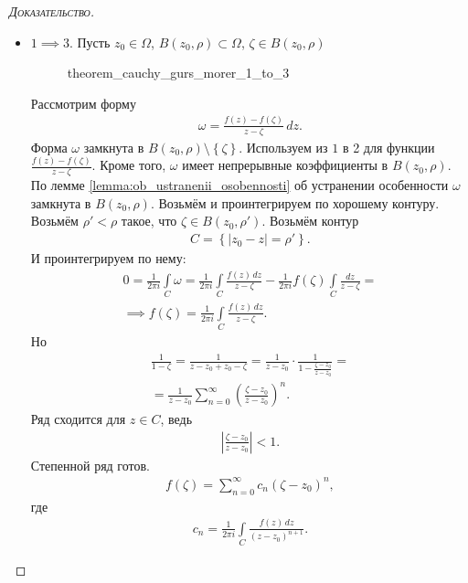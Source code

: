 \begin{proof}[\normalfont\textsc{Доказательство}]
\begin{itemize}
\item $1 \implies 3$. Пусть $z_0 \in \Omega$, $B(z_0, \rho) \subset \Omega$, $\zeta \in B(z_0, \rho)$
\begin{figure}[ht]
    \centering
    \caption{theorem_cauchy_gurs_morer_1_to_3}
    \label{fig:theorem_cauchy_gurs_morer_1_to_3}
\end{figure}

 Рассмотрим форму
 \begin{align*}
  \omega = \frac{f(z) - f(\zeta)}{z-\zeta}\,dz.
 \end{align*} Форма $\omega$ замкнута в $B(z_0, \rho) \setminus \left\{ \zeta \right\}$. Используем из $1$ в 2 для функции $\frac{f(z) - f(\zeta)}{z-\zeta}$. Кроме того, $\omega$ имеет непрерывные коэффициенты в $B(z_0, \rho)$. По лемме \ref{lemma:ob_ustranenii_osobennosti} об устранении особенности $\omega$ замкнута в $B(z_0, \rho)$. Возьмём и проинтегрируем по хорошему контуру. Возьмём $\rho' < \rho$ такое, что $\zeta \in B(z_0, \rho')$. Возьмём контур
 \begin{align*}
  C = \left\{ \left| z_0 - z \right| = \rho' \right\}.
 \end{align*} И проинтегрируем по нему:
 \begin{align*}
  0=\frac{1}{2\pi i} \int\limits_{C} \omega  = \frac{1}{2\pi i} \int\limits_{C} \frac{f(z)\,dz}{z - \zeta}  - \frac{1}{2\pi i} f(\zeta) \int\limits_{C} \frac{dz}{z - \zeta} = \\
  \implies f(\zeta) = \frac{1}{2\pi i} \int\limits_{C} \frac{f(z)\,dz}{z - \zeta}.
 \end{align*} Но
 \begin{align*}
  \frac{1}{1 - \zeta} = \frac{1}{z - z_0 + z_0 - \zeta} = \frac{1}{z - z_0} \cdot \frac{1}{1 -  \frac{\zeta - z_0}{z - z_0}} = \\
  = \frac{1}{z-z_0} \sum_{n=0}^{\infty} \left( \frac{\zeta-z_0}{z-z_0} \right)^{n}.
 \end{align*} Ряд сходится для $z \in C$, ведь
 \begin{align*}
  \left| \frac{\zeta - z_0}{z-z_0} \right| < 1.
 \end{align*}
 Степенной ряд готов.
 \begin{align*}
  f(\zeta) = \sum_{n=0}^{\infty} c_n \left( \zeta - z_0 \right)^{n},
 \end{align*} где
 \begin{align*}
  c_n = \frac{1}{2\pi i} \int\limits_{C} \frac{f(z)\,dz}{(z - z_0)^{n + 1}}.
 \end{align*} 
 \end{itemize}
\end{proof}
